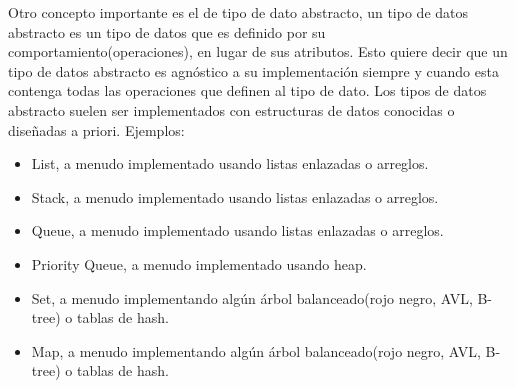 \documentclass[12pt]{article}
\begin{document}
Otro concepto importante es el de tipo de dato abstracto, un tipo de datos abstracto es un tipo de datos que es definido por su comportamiento(operaciones), en lugar de sus atributos. Esto quiere decir que un tipo de datos abstracto es agnóstico a su implementación siempre y cuando esta contenga todas las operaciones que definen al tipo de dato. Los tipos de datos abstracto suelen ser implementados con estructuras de datos conocidas o diseñadas a priori.
\newline
Ejemplos:
\begin{itemize}
    \item List, a menudo implementado usando listas enlazadas o arreglos.
    \item Stack, a menudo implementado usando listas enlazadas o arreglos.
    \item Queue, a menudo implementado usando listas enlazadas o arreglos.
    \item Priority Queue, a menudo implementado usando heap.
    \item Set, a menudo implementando algún árbol balanceado(rojo negro, AVL, B-tree) o tablas de hash.
    \item Map, a menudo implementando algún árbol balanceado(rojo negro, AVL, B-tree) o tablas de hash.
\end{itemize}
\end{document}
